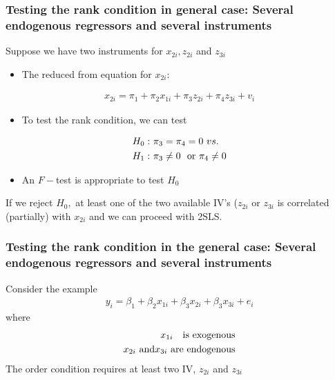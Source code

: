 \documentclass[a4paper,twoside,11pt]{article}
\begin{document}
\subsubsection{Testing the rank condition in general case: Several endogenous regressors and several instruments}
Suppose we have two instruments for $x_{2i}, z_{2i}$ and $z_{3i}$ 
\begin{itemize}
    \item The reduced from equation for $x_{2i}:$
\end{itemize}
\begin{equation*}
\begin{aligned}
x_{2i} = \pi_1 + \pi_2 x_{1i} + \pi_3 z_{2i} + \pi_4 z_{3i} + v_i
\end{aligned} 
\end{equation*}
\begin{itemize}
    \item To test the rank condition, we can test 
\end{itemize}
\begin{equation*}
\begin{aligned}
H_0 :& \ \pi_3 = \pi_4 = 0 \ vs.  \\
H_1 :& \ \pi_3 \ne 0 \ \ \textmd{or} \ \pi_4 \ne 0
\end{aligned} 
\end{equation*}
\begin{itemize}
    \item An $F-$test is appropriate to test $H_0$ 
\end{itemize}
If we reject $H_0,$ at least one of the two available IV's ($z_{2i}$ or $z_{3i}$ is correlated (partially) with $x_{2i}$ and we can proceed with 2SLS. 
\subsubsection{Testing the rank condition in the general case: Several endogenous regressors and several instruments}
Consider the example
\begin{equation*}
\begin{aligned}
y_i = \beta_1 + \beta_2 x_{1i} + \beta_3 x_{2i}+ \beta_3 x_{3i} + e_i
\end{aligned} 
\end{equation*}
where 
\begin{equation*}
\begin{aligned}
x_{1i} \ \ \ \textmd{is exogenous} \\
x_{2i} \ \textmd{and} x_{3i} \ \textmd{are endogenous}
\end{aligned} 
\end{equation*}
The order condition requires at least two IV, $z_{2i}$ and $z_{3i}$ 
\end{document}
